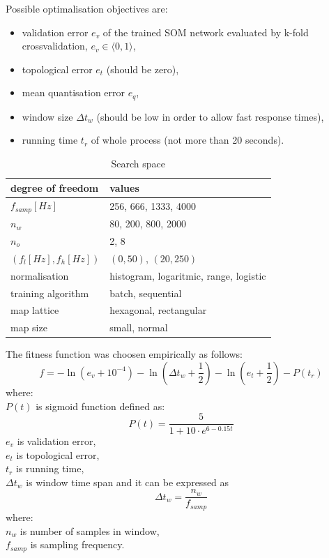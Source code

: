 \documentclass[a4paper]{IEEEtran}
\begin{document}
Possible optimalisation objectives are:%
\begin{itemize}
	\item validation error $ e_v $ of the trained SOM network evaluated by k-fold
	crossvalidation, $ e_v \in \langle 0, 1 \rangle $,
	\item topological error $ e_t $ (should be zero),
	\item mean quantisation error $ e_q $,
	\item window size $ \Delta t_w $ (should be low in order to allow fast response times),
	\item running time $ t_r $ of whole process (not more than 20 seconds).
\end{itemize}


\begin{table}[h]
\caption{Search space}
	\begin{center}
		\begin{tabular}{|l| l |}
			\hline
			degree of freedom & values \\
			\hline
			\hline
			$ f_{samp} [Hz] $ & 256, 666, 1333, 4000\\
			\hline
			$ n_w $ & 80, 200, 800, 2000 \\
			\hline
			$ n_o $ & 2, 8 \\
			\hline
			$ (f_l[Hz], f_h[Hz]) $ & $ (0, 50) $,  $ (20, 250) $  \\
			\hline
			normalisation & histogram, logaritmic, range, logistic \\
			\hline
			training algorithm & batch, sequential  \\
			\hline
			map lattice & hexagonal, rectangular \\
			\hline
			map size  & small, normal \\
			\hline
		\end{tabular}
	\end{center}
\label{searchspace}
\end{table}

The fitness function was choosen empirically as follows:
\[ f = -\ln(e_v+10^{-4}) - \ln(\Delta t_w+\frac{1}{2}) - \ln(e_t+\frac{1}{2}) - P(t_r) \]
where:\\
$ P(t) $ is sigmoid function defined as:
\[ P(t) = \frac{5}{1+10\cdot e^{6-0.15t}} \]
$ e_v $ is validation error,\\
$ e_t $ is topological error,\\
$ t_r $ is running time,\\
$ \Delta t_w $ is window time span and it can be expressed as 
\[  \Delta t_w = \frac{n_w}{f_{samp}}  \]
where:\\
$ n_w $ is number of samples in window,\\
$ f_{samp} $ is sampling frequency.
\end{document}
